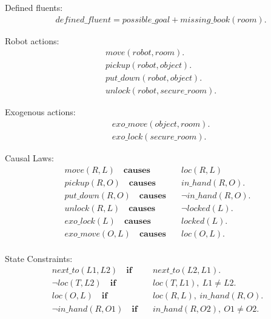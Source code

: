 \documentclass[11pt, oneside]{article}
\begin{document}
Defined fluents:
\begin{align*}
 &defined\_fluent = possible\_goal + missing\_book(room).
\end{align*}

Robot actions:
\begin{align*}
  &move(robot, room).\\
  &pickup(robot,object).\\
  &put\_down(robot,object).\\
  &unlock(robot,secure\_room).
\end{align*}

Exogenous actions:
\begin{align*}
  &exo\_move(object, room).\\
  &exo\_lock(secure\_room).
\end{align*} 

Causal Laws:
\begin{align*}
  move(R,L)\quad \mathbf{causes}&\quad loc(R,L)\\
  pickup(R,O)\quad \mathbf{causes}&\quad in\_hand(R,O). \\
  put\_down(R,O)\quad \mathbf{causes}&\quad \neg in\_hand(R,O).\\
  unlock(R,L)\quad \mathbf{causes}&\quad \neg locked(L).\\
  exo\_lock(L)\quad \mathbf{causes}&\quad locked(L).\\
  exo\_move(O,L)\quad \mathbf{causes}&\quad loc(O,L).\\
\end{align*}


State Constraints:
\begin{align*}
  next\_to(L1,L2)\quad \mathbf{if}&\quad next\_to(L2,L1).\\
  \neg loc(T, L2)\quad \mathbf{if}&\quad loc(T, L1), ~L1 \neq L2.\\
  loc(O, L)\quad \mathbf{if}&\quad loc(R, L),~in\_hand(R,O).\\
  \neg in\_hand(R,O1)\quad \mathbf{if}&\quad in\_hand(R,O2),~ O1 \neq O2.
\end{align*}
\end{document}
